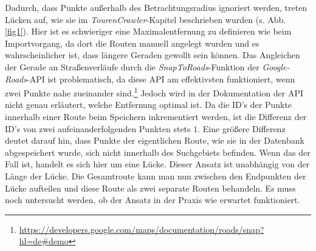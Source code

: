 \documentclass[a4paper,11pt,utf8]{scrartcl}
\begin{document}
Dadurch, dass Punkte außerhalb des Betrachtungsradius ignoriert werden, treten \glqq Lücken\grqq{} auf, wie sie im \textit{TourenCrawler}-Kapitel beschrieben wurden (s. Abb. \ref{fig1}). Hier ist es schwieriger eine Maximalentfernung zu definieren wie beim Importvorgang, da dort die Routen manuell angelegt wurden und es wahrscheinlicher ist, dass längere Geraden gewollt sein können. Das Angleichen der Gerade an Straßenverläufe durch die \textit{SnapToRoads}-Funktion der \textit{Google-Roads}-API ist problematisch, da diese API am effektivsten funktioniert, wenn zwei Punkte nahe zueinander sind.\footnote{\url{https://developers.google.com/maps/documentation/roads/snap?hl=de\#demo}} Jedoch wird in der Dokumentation der API nicht genau erläutert, welche Entfernung optimal ist. Da die ID's der Punkte innerhalb einer Route beim Speichern inkrementiert werden, ist die Differenz der ID's von zwei aufeinanderfolgenden Punkten stets $1$. Eine größere Differenz deutet darauf hin, dass Punkte der eigentlichen Route, wie sie in der Datenbank abgespeichert wurde, sich nicht innerhalb des Suchgebiets befinden. Wenn das der Fall ist, handelt es sich hier um eine Lücke. Dieser Ansatz ist unabhängig von der Länge der Lücke. Die Gesamtroute kann man nun zwischen den Endpunkten der Lücke aufteilen und diese Route als zwei separate Routen behandeln. Es muss noch untersucht werden, ob der Ansatz in der Praxis wie erwartet funktioniert.
\end{document}
